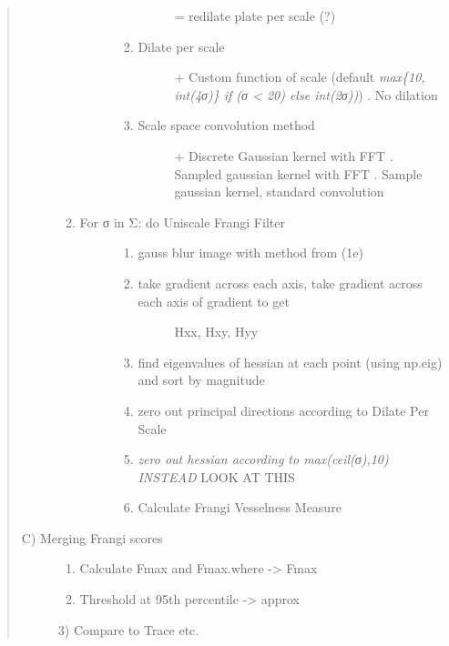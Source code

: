\begin{quote}
\begin{description}
\begin{enumerate}
\begin{description}
\begin{enumerate}
\begin{description}
    = redilate plate per scale (?)
    \end{description}
  \item
    \begin{description}
    \item[Dilate per scale]
    + Custom function of scale (default \emph{max\{10, int(4σ)\} if (σ
    \textless{} 20) else int(2σ))}) . No dilation
    \end{description}
  \item
    \begin{description}
    \item[Scale space convolution method]
    + Discrete Gaussian kernel with FFT . Sampled gaussian kernel with
    FFT . Sample gaussian kernel, standard convolution
    \end{description}
  \end{enumerate}
  \end{description}
\item
  \begin{description}
  \item[For σ in Σ: do Uniscale Frangi Filter]
  \begin{enumerate}
  \def\labelenumii{\alph{enumii})}
  \item
    gauss blur image with method from (1e)
  \item
    \begin{description}
    \item[take gradient across each axis, take gradient across each axis
    of gradient to get]
    Hxx, Hxy, Hyy
    \end{description}
  \item
    find eigenvalues of hessian at each point (using np.eig) and sort by
    magnitude
  \item
    zero out principal directions according to Dilate Per Scale
  \item
    \emph{zero out hessian according to max(ceil(σ),10) INSTEAD} LOOK AT
    THIS
  \item
    Calculate Frangi Vesselness Measure
  \end{enumerate}
  \end{description}
\end{enumerate}
\item[C) Merging Frangi scores]
\begin{enumerate}
\def\labelenumi{\arabic{enumi})}
\tightlist
\item
  Calculate Fmax and Fmax.where -\textgreater{} Fmax
\item
  Threshold at 95th percentile -\textgreater{} approx
\end{enumerate}

3) Compare to Trace etc.
\end{description}
\end{quote}
